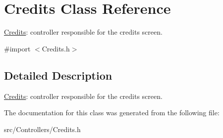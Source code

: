 \hypertarget{interface_credits}{
\section{\-Credits \-Class \-Reference}
\label{interface_credits}
}


\hyperlink{interface_credits}{\-Credits}\-: controller responsible for the credits screen.  




{\ttfamily \#import $<$\-Credits.\-h$>$}



\subsection{\-Detailed \-Description}
\hyperlink{interface_credits}{\-Credits}\-: controller responsible for the credits screen. 

\-The documentation for this class was generated from the following file\-:\begin{DoxyCompactItemize}
\item 
src/\-Controllers/\-Credits.\-h\end{DoxyCompactItemize}
